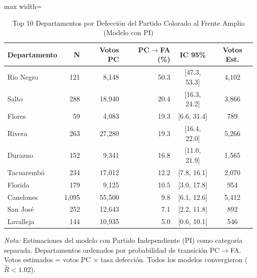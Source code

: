 \begin{table}[H]
\centering
\caption{Top 10 Departamentos por Defección del Partido Colorado al Frente Amplio (Modelo con PI)}
\label{tab:dept_pc_top10}
\small
\begin{adjustbox}{max width=\textwidth}
\begin{tabular}{lrrrcc}
\toprule
\textbf{Departamento} & \textbf{N} & \textbf{Votos PC} & \textbf{PC$\rightarrow$FA (\%)} & \textbf{IC 95\%} & \textbf{Votos Est.} \\
\midrule
Río Negro & 121 & 8,148 & 50.3 & [47.3, 53.3] & 4,102 \\
Salto & 288 & 18,940 & 20.4 & [16.3, 24.2] & 3,866 \\
Flores & 59 & 4,083 & 19.3 & [6.6, 31.4] & 789 \\
Rivera & 263 & 27,280 & 19.3 & [16.4, 22.0] & 5,266 \\
Durazno & 152 & 9,341 & 16.8 & [11.0, 21.9] & 1,565 \\
Tacuarembó & 234 & 17,012 & 12.2 & [7.8, 16.1] & 2,070 \\
Florida & 179 & 9,125 & 10.5 & [3.0, 17.8] & 954 \\
Canelones & 1,095 & 55,500 & 9.8 & [6.1, 12.6] & 5,412 \\
San José & 252 & 12,643 & 7.1 & [2.2, 11.8] & 892 \\
Lavalleja & 144 & 10,935 & 5.0 & [0.6, 10.1] & 546 \\
\bottomrule
\end{tabular}
\end{adjustbox}
\begin{flushleft}
\small \textit{Nota:} Estimaciones del modelo con Partido Independiente (PI) como categoría separada. Departamentos ordenados por probabilidad de transición PC$\rightarrow$FA. Votos estimados = votos PC $\times$ tasa defección. Todos los modelos convergieron ($\hat{R} < 1.02$).
\end{flushleft}
\end{table}
